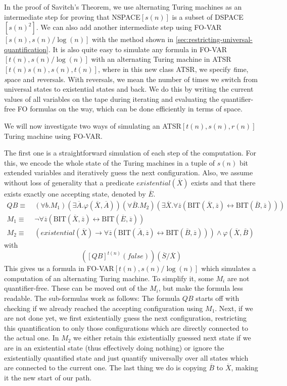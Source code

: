 In the proof of Savitch's Theorem, we use alternating Turing machines as an intermediate step for proving that NSPACE$[s(n)]$ is a subset of DSPACE$[s(n)^2]$.
We can also add another intermediate step using FO-VAR$[s(n), s(n)/\log(n)]$ with the method shown in \cref{sec:restricting-universal-quantification}.
It is also quite easy to simulate any formula in FO-VAR$[t(n), s(n)/\log(n)]$ with an alternating Turing machine in ATSR$[t(n)s(n), s(n), t(n)]$, where in this new class ATSR, we specify \emph{t}ime, \emph{s}pace and \emph{r}eversals.
With reversals, we mean the number of times we switch from universal states to existential states and back.
We do this by writing the current values of all variables on the tape during iterating and evaluating the quantifier-free FO formulas on the way, which can be done efficiently in terms of space.

We will now investigate two ways of simulating an ATSR$[t(n), s(n), r(n)]$ Turing machine using FO-VAR\@.

The first one is a straightforward simulation of each step of the computation.
For this, we encode the whole state of the Turing machines in a tuple of $s(n)$ bit extended variables and iteratively guess the next configuration.
Also, we assume without loss of generality that a predicate $existential(\overline{X})$ exists and that there exists exactly one accepting state, denoted by $\overline{E}$.
\[
    \begin{aligned}
        QB \equiv~&(\forall b.M_{1})(\exists\overline{A}.\varphi(\overline{X}, \overline{A}))(\forall \overline{B}.M_{2})(\exists \overline{X}. \forall \overline{z}(\text{BIT}(\overline{X}, \overline{z}) \leftrightarrow \text{BIT}(\overline{B}, \overline{z}))) \\
        M_{1} \equiv~&\neg\forall \overline{z}(\text{BIT}(\overline{X}, \overline{z}) \leftrightarrow \text{BIT}(\overline{E}, \overline{z})) \\
        M_{2} \equiv~& (existential(\overline{X}) \to \forall \overline{z}(\text{BIT}(\overline{A}, \overline{z}) \leftrightarrow \text{BIT}(\overline{B}, \overline{z}))) \land \varphi(\overline{X}, \overline{B})
    \end{aligned}
\]
with \[
         \left([QB]^{t(n)}(false)\right)(\overline{S} / \overline{X})
\]
This gives us a formula in FO-VAR$[t(n), s(n)/\log(n)]$ which simulates a computation of an alternating Turing machine.
To simplify it, some $M_i$ are not quantifier-free.
These can be moved out of the $M_i$, but make the formula less readable.
The sub-formulas work as follows:
The formula $QB$ starts off with checking if we already reached the accepting configuration using $M_1$.
Next, if we are not done yet, we first existentially guess the next configuration, restricting this quantification to only those configurations which are directly connected to the actual one.
In $M_2$ we either retain this existentially guessed next state if we are in an existential state (thus effectively doing nothing) or ignore the existentially quantified state and just quantify universally over all states which are connected to the current one.
The last thing we do is copying $\overline{B}$ to $\overline{X}$, making it the new start of our path.

